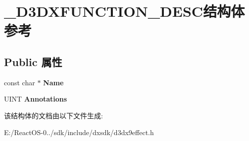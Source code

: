 \hypertarget{struct___d3_d_x_f_u_n_c_t_i_o_n___d_e_s_c}{}\section{\+\_\+\+D3\+D\+X\+F\+U\+N\+C\+T\+I\+O\+N\+\_\+\+D\+E\+S\+C结构体 参考}
\label{struct___d3_d_x_f_u_n_c_t_i_o_n___d_e_s_c}
\subsection*{Public 属性}
\begin{DoxyCompactItemize}
\item 
\mbox{\label{struct___d3_d_x_f_u_n_c_t_i_o_n___d_e_s_c_ae89f742aa3d3f3c17766c2caaea3906a}} 
const char $\ast$ {\bfseries Name}
\item 
\mbox{\label{struct___d3_d_x_f_u_n_c_t_i_o_n___d_e_s_c_a3bee8690775cb5c45e10d5a4d00021f6}} 
U\+I\+NT {\bfseries Annotations}
\end{DoxyCompactItemize}


该结构体的文档由以下文件生成\+:\begin{DoxyCompactItemize}
\item 
E\+:/\+React\+O\+S-\/0../sdk/include/dxsdk/d3dx9effect.\+h\end{DoxyCompactItemize}
